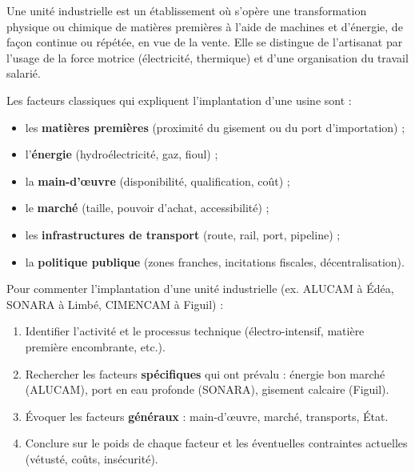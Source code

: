\documentclass[11pt]{article}
\newcommand{\cle}[1]{{\popxbold\color{popdark}#1}}
\begin{document}
\begin{definition}
Une \cle{unité industrielle} est un établissement où s'opère une transformation physique ou chimique de matières premières à l'aide de machines et d'énergie, de façon continue ou répétée, en vue de la vente. Elle se distingue de l'artisanat par l'usage de la force motrice (électricité, thermique) et d'une organisation du travail salarié.
\end{definition}

\begin{definition}
Les facteurs classiques qui expliquent l'implantation d'une usine sont :
\begin{itemize}
\item les \textbf{matières premières} (proximité du gisement ou du port d'importation) ;
\item l'\textbf{énergie} (hydroélectricité, gaz, fioul) ;
\item la \textbf{main-d'œuvre} (disponibilité, qualification, coût) ;
\item le \textbf{marché} (taille, pouvoir d'achat, accessibilité) ;
\item les \textbf{infrastructures de transport} (route, rail, port, pipeline) ;
\item la \textbf{politique publique} (zones franches, incitations fiscales, décentralisation).
\end{itemize}
\end{definition}

\begin{methode}
Pour commenter l'implantation d'une unité industrielle (ex. ALUCAM à Édéa, SONARA à Limbé, CIMENCAM à Figuil) :
\begin{enumerate}
\item Identifier l'activité et le processus technique (électro-intensif, matière première encombrante, etc.).
\item Rechercher les facteurs \textbf{spécifiques} qui ont prévalu : énergie bon marché (ALUCAM), port en eau profonde (SONARA), gisement calcaire (Figuil).
\item Évoquer les facteurs \textbf{généraux} : main-d'œuvre, marché, transports, État.
\item Conclure sur le poids de chaque facteur et les éventuelles contraintes actuelles (vétusté, coûts, insécurité).
\end{enumerate}
\end{methode}
\end{document}
